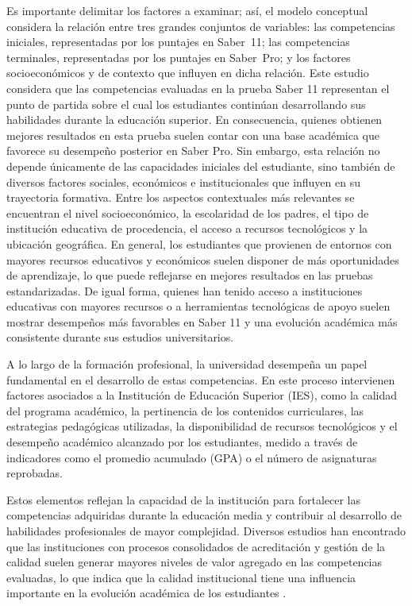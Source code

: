 Es importante delimitar los factores a examinar; así, el modelo conceptual considera la relación entre tres
grandes conjuntos de variables: las competencias iniciales, representadas por los puntajes en Saber~11;
las competencias terminales, representadas por los puntajes en Saber~Pro; y los factores socioeconómicos
y de contexto que influyen en dicha relación. Este estudio considera que las competencias evaluadas en la prueba Saber 11 representan el punto de partida sobre el cual los estudiantes continúan desarrollando sus habilidades durante la educación superior. En consecuencia, quienes obtienen mejores resultados en esta prueba suelen contar con una base académica que favorece su desempeño posterior en Saber Pro. Sin embargo, esta relación no depende únicamente de las capacidades iniciales del estudiante, sino también de diversos factores sociales, económicos e institucionales que influyen en su trayectoria formativa.
Entre los aspectos contextuales más relevantes se encuentran el nivel socioeconómico, la escolaridad de los padres, el tipo de institución educativa de procedencia, el acceso a recursos tecnológicos y la ubicación geográfica. En general, los estudiantes que provienen de entornos con mayores recursos educativos y económicos suelen disponer de más oportunidades de aprendizaje, lo que puede reflejarse en mejores resultados en las pruebas estandarizadas. De igual forma, quienes han tenido acceso a instituciones educativas con mayores recursos o a herramientas tecnológicas de apoyo suelen mostrar desempeños más favorables en Saber 11 y una evolución académica más consistente durante sus estudios universitarios.

A lo largo de la formación profesional, la universidad desempeña un papel fundamental en el desarrollo de estas competencias. En este proceso intervienen factores asociados a la Institución de Educación Superior (IES), como la calidad del programa académico, la pertinencia de los contenidos curriculares, las estrategias pedagógicas utilizadas, la disponibilidad de recursos tecnológicos y el desempeño académico alcanzado por los estudiantes, medido a través de indicadores como el promedio acumulado (GPA) o el número de asignaturas reprobadas. 

Estos elementos reflejan la capacidad de la institución para fortalecer las competencias adquiridas durante la educación media y contribuir al desarrollo de habilidades profesionales de mayor complejidad. Diversos estudios han encontrado que las instituciones con procesos consolidados de acreditación y gestión de la calidad suelen generar mayores niveles de valor agregado en las competencias evaluadas, lo que indica que la calidad institucional tiene una influencia importante en la evolución académica de los estudiantes \cite{maestre2022_valorAgregadoCalidadEducativa}.

